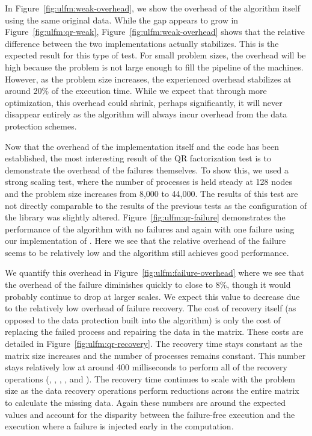 In Figure~\ref{fig:ulfm:weak-overhead}, we show the overhead of the \abft 
algorithm itself using the same original data. While the gap appears to grow in 
Figure~\ref{fig:ulfm:qr-weak}, Figure~\ref{fig:ulfm:weak-overhead} shows that the 
relative difference between the two implementations 
actually stabilizes. This is the expected result for this type of test. For small 
problem sizes, the overhead will be high because the problem is not large enough to 
fill the pipeline of the machines. However, as the problem size increases, the 
experienced overhead stabilizes at around 20\% of the execution time. While we expect 
that through more optimization, this overhead could shrink, perhaps significantly, it 
will never disappear entirely as the \abft algorithm will always incur overhead from 
the data protection schemes.

Now that the overhead of the \mpi implementation itself and the \abft code has been 
established, the most interesting result of the QR factorization test is to demonstrate 
the overhead of the failures themselves. To show this, we used a strong scaling test, 
where the number of processes is held steady at 128 nodes and the problem size 
increases from 8,000 to 44,000. The results of this test are not directly comparable to 
the results of the previous tests as the configuration of the \mpi library was slightly 
altered. Figure~\ref{fig:ulfm:qr-failure} demonstrates the performance of the \abft 
algorithm with no failures and again with one failure using our \ulfm implementation of 
\mpi. Here we see that the relative overhead of the failure seems to be relatively low 
and the algorithm still achieves good performance.

We quantify this overhead in Figure~\ref{fig:ulfm:failure-overhead} where we see that 
the overhead of the failure diminishes quickly to close to 8\%, though it would 
probably continue to drop at larger scales. We expect this value to decrease due to the 
relatively low overhead of failure recovery. The cost of recovery itself (as opposed to 
the data protection built into the \abft algorithm) is only the cost of replacing the 
failed process and repairing the data in the matrix. These costs are detailed in 
Figure~\ref{fig:ulfm:qr-recovery}. The \mpi recovery time stays constant as the matrix 
size increases and the number of processes remains constant. This number stays 
relatively low at around 400 milliseconds to perform all of the recovery 
operations (, , , , 
and ). The \abft recovery time continues to scale with the problem 
size as the data recovery operations perform reductions across the entire matrix 
to calculate the missing data. Again these numbers are around the expected values 
and account for the disparity between the failure-free execution and the execution 
where a failure is injected early in the computation.

